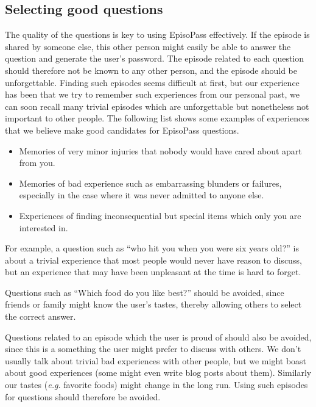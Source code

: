 \documentclass[runningheads,a4paper]{llncs}
\begin{document}
\subsection{Selecting good questions}

The quality of the questions is key to using EpisoPass effectively.
If the episode is shared by someone else,
this other person might easily be able to answer the question and generate the
user's password.
%
The episode related to each question should therefore not be known to any other person,
and the episode should be unforgettable.
%
Finding such episodes seems difficult at first, but our experience
has been that we try to remember such experiences from our personal past,
we can soon recall many trivial episodes which are unforgettable but
nonetheless not important to other people.
%
The following list shows some examples of experiences that we believe
make good candidates for EpisoPass questions.

\begin{itemize}
\item Memories of very minor injuries that nobody would have cared about apart from you.

\item Memories of bad experience such as embarrassing blunders or failures,
especially in the case where it was never admitted to anyone else.

\item Experiences of finding inconsequential but special items which only you are interested in.
\end{itemize}

For example, a question such as
``who hit you when you were six years old?''
is about a trivial experience that most people would never have reason to discuss,
but an experience that may have been unpleasant at the time is hard to forget.

Questions such as ``Which food do you like best?'' should be avoided,
since friends or family might know the user's tastes, thereby allowing 
others to select the correct answer.

Questions related to an episode which the user is proud of should also be
avoided, since this is a something the user might prefer to discuss with others.
We don't usually talk about trivial bad experiences with other people,
but we might boast about good experiences (some might even write blog posts about them).
Similarly our tastes ({\it e.g.\/} favorite foods) might change in the long run.
Using such episodes for questions should therefore be avoided.
\end{document}
